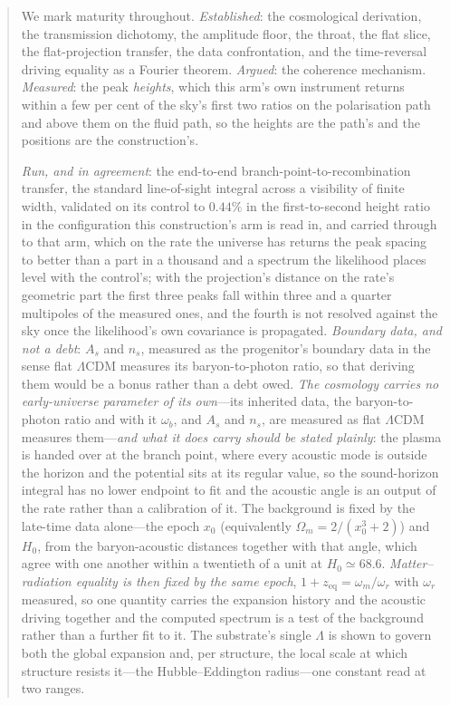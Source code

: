 \documentclass[11pt,a4paper]{article}
\theoremstyle{plain}
\theoremstyle{definition}
\theoremstyle{remark}
\begin{document}
\begin{abstract}
We mark maturity throughout. \emph{Established}: the cosmological derivation, the transmission dichotomy, the amplitude floor, the throat, the flat slice, the flat-projection transfer, the data confrontation, and the time-reversal driving equality as a Fourier theorem. \emph{Argued}: the coherence mechanism. \emph{Measured}: the peak \emph{heights}, which this arm's own instrument returns within a few per cent of the sky's first two ratios on the polarisation path and above them on the fluid path, so the heights are the path's and the positions are the construction's. 

\emph{Run, and in agreement}: the end-to-end branch-point-to-recombination transfer, the standard line-of-sight integral across a visibility of finite width, validated on its control to $0.44\%$ in the first-to-second height ratio in the configuration this construction's arm is read in, and carried through to that arm, which on the rate the universe has returns the peak spacing to better than a part in a thousand and a spectrum the likelihood places level with the control's; with the projection's distance on the rate's geometric part the first three peaks fall within three and a quarter multipoles of the measured ones, and the fourth is not resolved against the sky once the likelihood's own covariance is propagated. \emph{Boundary data, and not a debt}: $A_s$ and $n_s$, measured as the progenitor's boundary data in the sense flat $\Lambda$CDM measures its baryon-to-photon ratio, so that deriving them would be a bonus rather than a debt owed. \emph{The cosmology carries no early-universe parameter of its own}---its inherited data, the baryon-to-photon ratio and with it $\omega_b$, and $A_s$ and $n_s$, are measured as flat $\Lambda$CDM measures them---\emph{and what it does carry should be stated plainly}: the plasma is handed over at the branch point, where every acoustic mode is outside the horizon and the potential sits at its regular value, so the sound-horizon integral has no lower endpoint to fit and the acoustic angle is an output of the rate rather than a calibration of it. The background is fixed by the late-time data alone---the epoch $x_{0}$ (equivalently $\Omega_m=2/(x_{0}^{3}+2)$) and $H_{0}$, from the baryon-acoustic distances together with that angle, which agree with one another within a twentieth of a unit at $H_{0}\simeq68.6$. \emph{Matter--radiation equality is then fixed by the same epoch}, $1+z_{\mathrm{eq}}=\omega_m/\omega_r$ with $\omega_r$ measured, so one quantity carries the expansion history and the acoustic driving together and the computed spectrum is a test of the background rather than a further fit to it. The substrate's single $\Lambda$ is shown to govern both the global expansion and, per structure, the local scale at which structure resists it---the Hubble--Eddington radius---one constant read at two ranges.
\end{abstract}
\end{document}

